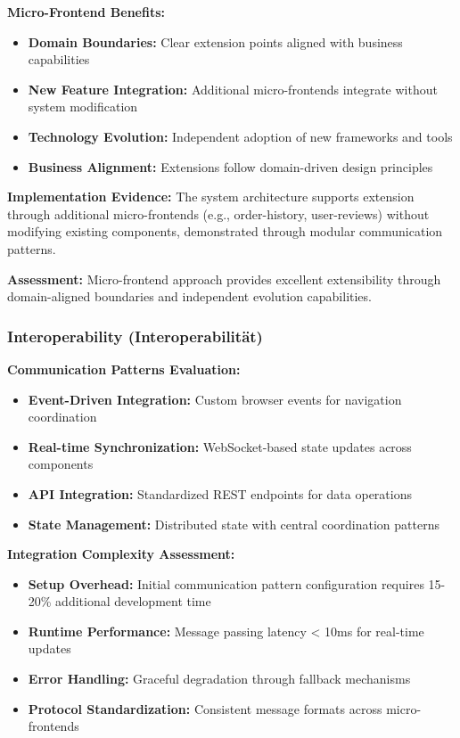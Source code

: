 \documentclass[12pt,a4paper]{report}
\begin{document}
\textbf{Micro-Frontend Benefits:}
\begin{itemize}
\item \textbf{Domain Boundaries:} Clear extension points aligned with business capabilities
\item \textbf{New Feature Integration:} Additional micro-frontends integrate without system modification
\item \textbf{Technology Evolution:} Independent adoption of new frameworks and tools
\item \textbf{Business Alignment:} Extensions follow domain-driven design principles
\end{itemize}

\textbf{Implementation Evidence:} The system architecture supports extension through additional micro-frontends (e.g., order-history, user-reviews) without modifying existing components, demonstrated through modular communication patterns.

\textbf{Assessment:} Micro-frontend approach provides excellent extensibility through domain-aligned boundaries and independent evolution capabilities.

\subsubsection{Interoperability (Interoperabilität)}

\textbf{Communication Patterns Evaluation:}
\begin{itemize}
\item \textbf{Event-Driven Integration:} Custom browser events for navigation coordination
\item \textbf{Real-time Synchronization:} WebSocket-based state updates across components
\item \textbf{API Integration:} Standardized REST endpoints for data operations
\item \textbf{State Management:} Distributed state with central coordination patterns
\end{itemize}

\textbf{Integration Complexity Assessment:}
\begin{itemize}
\item \textbf{Setup Overhead:} Initial communication pattern configuration requires 15-20\% additional development time
\item \textbf{Runtime Performance:} Message passing latency < 10ms for real-time updates
\item \textbf{Error Handling:} Graceful degradation through fallback mechanisms
\item \textbf{Protocol Standardization:} Consistent message formats across micro-frontends
\end{itemize}
\end{document}
